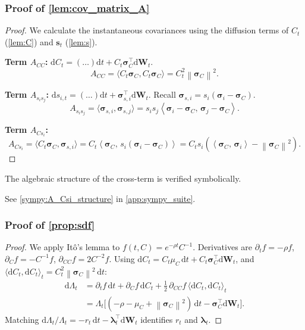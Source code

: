 \documentclass[11pt,letterpaper,oneside]{article}
\numberwithin{equation}{section}
\newcommand{\1}{\mathbf{1}}
\newcommand{\diff}{\mathrm{d}}
\newcommand{\norm}[1]{\left\lVert #1\right\rVert}
\newcommand{\ip}[2]{\left\langle #1,\,#2\right\rangle}
\begin{document}
\subsubsection{Proof of \cref{lem:cov_matrix_A}}\label{app:proof:lem:cov_matrix_A}
\begin{proof}
We calculate the instantaneous covariances using the diffusion terms of $C_t$ (\cref{lem:C}) and $\bm{s}_t$ (\cref{lem:s}).

\textbf{Term $A_{CC}$:}
$\diff C_t = (\dots)\diff t + C_t \bm{\sigma}_C^{\top}\diff\bm{W}_t$.
\[
    A_{CC} = \langle C_t \bm{\sigma}_C, C_t \bm{\sigma}_C \rangle = C_t^2 
\norm{\bm{\sigma}_C}^2.
\]

\textbf{Term $A_{s_i s_j}$:}
$\diff s_{i,t} = (\dots)\diff t + \bm{\sigma}_{s,i}^{\top}\diff\bm{W}_t$. Recall $\bm{\sigma}_{s,i} = s_i(\bm{\sigma}_i-\bm{\sigma}_C)$.
\[
    A_{s_i s_j} = \langle \bm{\sigma}_{s,i}, \bm{\sigma}_{s,j} \rangle = s_i s_j \ip{\bm{\sigma}_i-\bm{\sigma}_C}{\bm{\sigma}_j-\bm{\sigma}_C}.
\]

\textbf{Term $A_{C s_i}$:}
\[
    A_{C s_i} = \langle C_t \bm{\sigma}_C, \bm{\sigma}_{s,i} \rangle = C_t \ip{\bm{\sigma}_C}{s_i(\bm{\sigma}_i-\bm{\sigma}_C)} = C_t s_i (\ip{\bm{\sigma}_C}{\bm{\sigma}_i} - 
\norm{\bm{\sigma}_C}^2).
\]
\end{proof}

\begin{sympycheck}[title={Verification: Structure of Covariance Cross-Term $A_{C s_i}$ (\cref{lem:cov_matrix_A})}]\label{sympy:A_Csi}
The algebraic structure of the cross-term is verified symbolically.

See \cref{sympy:A_Csi_structure} in \cref{app:sympy_suite}.\end{sympycheck}


\subsubsection{Proof of \cref{prop:sdf}}\label{app:proof:prop:sdf}
\begin{proof}
We apply It\^o's lemma to $f(t, C) = e^{-\rho t} C^{-1}$. Derivatives are $\partial_t f = -\rho f$, $\partial_C f = -C^{-1} f$, $\partial_{CC} f = 2C^{-2} f$. Using $\diff C_t = C_t\mu_C\,\diff t + C_t\bm{\sigma}_C^{\top}\diff\bm{W}_t$, and $\langle\diff C_t,\diff C_t\rangle_t = C_t^2
\norm{\bm{\sigma}_C}^2\,\diff t$:
\begin{align}
  \diff\Lambda_t &= \partial_t f\,\diff t + \partial_C f\,\diff C_t + \tfrac12\,\partial_{CC} f\,\langle\diff C_t,\diff C_t\rangle_t \\
  &= \Lambda_t\Big[(-\rho-\mu_C+
\norm{\bm{\sigma}_C}^2)\,\diff t - \bm{\sigma}_C^{\top}\diff\bm{W}_t\Big].
\end{align}
Matching $\diff\Lambda_t/\Lambda_t = -r_t\,\diff t - \bm{\lambda}_t^{\top}\diff\bm{W}_t$ identifies $r_t$ and $\bm{\lambda}_t$.
\end{proof}
\end{document}
